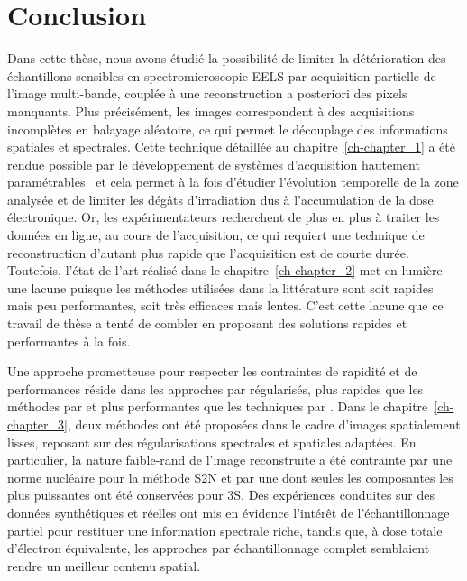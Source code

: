 \chapter{Conclusion}\label{chap-conclusion}

Dans cette thèse, nous avons étudié la possibilité de limiter la détérioration des échantillons sensibles en spectromicroscopie EELS par acquisition partielle de l'image multi-bande, couplée à une reconstruction a posteriori des pixels manquants. 
%
Plus précisément, les images correspondent à des acquisitions incomplètes en balayage aléatoire, ce qui permet le découplage des informations spatiales et spectrales.
%
Cette technique détaillée au chapitre~\ref{ch-chapter_1} a été rendue possible par le développement de systèmes d'acquisition hautement paramétrables~\cite{tararan2016random, zobelli2019spatial, tence2019following} et cela permet à la fois d'étudier l'évolution temporelle de la zone analysée et de limiter les dégâts d'irradiation dus à l'accumulation de la dose électronique.
%
Or, les expérimentateurs recherchent de plus en plus à traiter les données en ligne, \ie{} au cours de l'acquisition, ce qui requiert une technique de reconstruction d'autant plus rapide que l'acquisition est de courte durée. Toutefois, l'état de l'art réalisé dans le chapitre~\ref{ch-chapter_2} met en lumière une lacune puisque les méthodes utilisées dans la littérature sont soit rapides mais peu performantes, soit très efficaces mais lentes. C'est cette lacune que ce travail de thèse a tenté de combler en proposant des solutions rapides et performantes à la fois.

Une approche prometteuse pour respecter les contraintes de rapidité et de performances réside dans les approches par  régularisés, plus rapides que les méthodes par  et plus performantes que les techniques par . Dans le chapitre~\ref{ch-chapter_3}, deux méthodes ont été proposées dans le cadre d'images spatialement lisses, reposant sur des régularisations spectrales et spatiales adaptées. 
%
En particulier, la nature faible-rand de l'image reconstruite a été contrainte par une norme nucléaire pour la méthode S2N et par une  dont seules les composantes les plus puissantes ont été conservées pour 3S.
%
Des expériences conduites sur des données synthétiques et réelles ont mis en évidence l'intérêt de l'échantillonnage partiel pour restituer une information spectrale riche, tandis que, à dose totale d'électron équivalente, les approches par échantillonnage complet semblaient rendre un meilleur contenu spatial.

